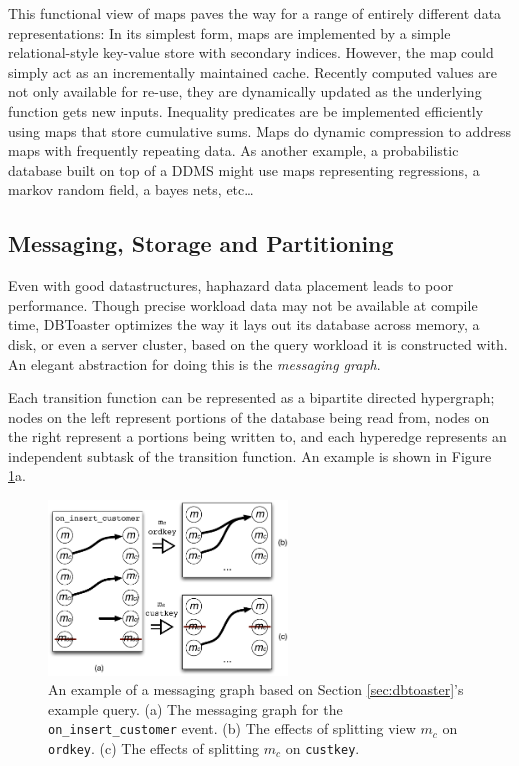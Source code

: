 This functional view of maps paves the way for a range of entirely different data representations: In its simplest form, maps are implemented by a simple relational-style key-value store with secondary indices\cite{berkeleydb}.  However, the map could simply act as an incrementally maintained cache.  Recently computed values are not only available for re-use, they are dynamically updated as the underlying function gets new inputs. Inequality predicates are be implemented efficiently using maps that store cumulative sums\cite{rangequeries}.  Maps do dynamic compression to address maps with frequently repeating data.  As another example, a probabilistic database built on top of a DDMS might use maps representing regressions, a markov random field, a bayes nets, etc\ldots

\subsection{Messaging, Storage and Partitioning}
Even with good datastructures, haphazard data placement leads to poor performance.  Though precise workload data may not be available at compile time, DBToaster optimizes the way it lays out its database across memory, a disk, or even a server cluster, based on the query workload it is constructed with.  An elegant abstraction for doing this is the \textit{messaging graph}.

Each transition function can be represented as a bipartite directed hypergraph; nodes on the left represent portions of the database being read from, nodes on the right represent a portions being written to, and each hyperedge represents an independent subtask of the transition function.  An example is shown in Figure \ref{fig:diag:messagingGraph}a.

\begin{figure}
\begin{center}
\includegraphics[width=2.5in]{graphics/MessagingGraph}
\end{center}
\caption{An example of a messaging graph based on Section \ref{sec:dbtoaster}'s example query.  (a) The messaging graph for the \texttt{on\_insert\_customer} event.  (b) The effects of splitting view $m_c$ on \texttt{ordkey}.  (c) The effects of splitting $m_c$ on \texttt{custkey}.}
\label{fig:diag:messagingGraph}
\vspace*{-0.2in}
\end{figure}

